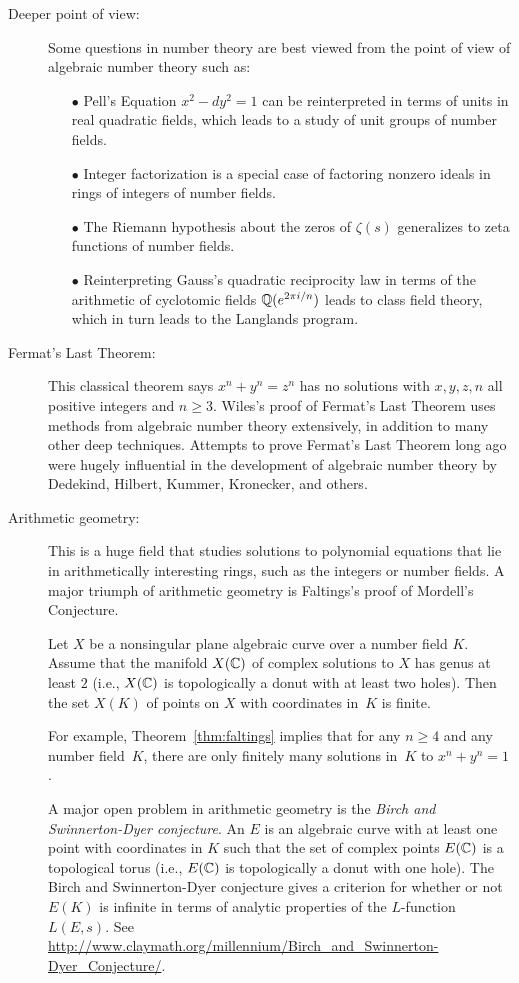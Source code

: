 \begin{description}
\item[Deeper point of view:]
Some questions in number theory
are best viewed from the point of view of algebraic number
theory such as:
\begin{enumerate}
	\item[$\bullet$]
		Pell's Equation $x^2-dy^2=1$ can be reinterpreted
		in terms of units in real quadratic fields, which
		leads to a study of unit groups of number fields.
	\item[$\bullet$]
		Integer factorization is a special case of factoring nonzero
		ideals in rings of integers of number fields.
	\item[$\bullet$]
		The Riemann hypothesis about the zeros of $\zeta(s)$
		generalizes to zeta functions of number fields.
	\item[$\bullet$]
		Reinterpreting Gauss's quadratic reciprocity law in terms of
		the arithmetic of cyclotomic fields $\mathbb{Q}(e^{2\pi i/n})$ leads
		to class field theory, which in turn leads to the Langlands
		program.
\end{enumerate}

\item[Fermat's Last Theorem:] 
This classical theorem says $x^n+y^n=z^n$ has no solutions with
$x,y,z,n$ all positive integers and $n\geq 3$. Wiles's
proof of Fermat's Last Theorem uses methods from
algebraic number theory extensively, in addition to many other deep
techniques.  Attempts to prove Fermat's Last Theorem long ago were
hugely influential in the development of algebraic number theory
by Dedekind, Hilbert, Kummer, Kronecker, and others.

\item[Arithmetic geometry:] This is a huge field that studies
solutions to polynomial equations that lie in arithmetically
interesting rings, such as the integers or number fields.  A
major triumph of arithmetic geometry is Faltings's proof of Mordell's
Conjecture.
\begin{theorem}[Faltings]\label{thm:faltings}
	Let $X$ be a nonsingular plane algebraic curve over a number
	field $K$.  Assume that the manifold $X(\mathbb{C})$ of complex solutions to
	$X$ has genus at least $2$ (i.e., $X(\mathbb{C})$ is topologically a donut
	with at least two holes).  Then the set $X(K)$ of points on $X$ with
	coordinates in~$K$ is finite.
\end{theorem}
For example, Theorem~\ref{thm:faltings} implies that for any $n\geq 4$
and any number field~$K$, there are only finitely many solutions
in~$K$ to $x^n+y^n=1$.

A major open problem in arithmetic geometry is the
{\em Birch and Swinnerton-Dyer conjecture}.
An  $E$ is an algebraic curve with at least one point
with coordinates in $K$ such that the set of complex points
$E(\mathbb{C})$ is a topological torus (i.e., $E(\mathbb{C})$ is topologically a donut
with one hole).
The Birch and Swinnerton-Dyer conjecture gives a
criterion for whether or not $E(K)$ is infinite in
terms of analytic properties of the $L$-function $L(E,s)$.
See \url{http://www.claymath.org/millennium/Birch_and_Swinnerton-Dyer_Conjecture/}.

\end{description}



